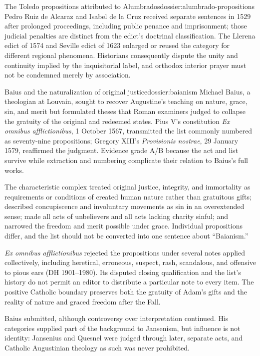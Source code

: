 \begin{heresydossier}{The Toledo propositions attributed to Alumbrados}{dossier:alumbrado-propositions}
\aftermathfield Pedro Ruiz de Alcaraz and Isabel de la Cruz received separate sentences in 1529 after prolonged proceedings, including public penance and imprisonment; those judicial penalties are distinct from the edict's doctrinal classification. The Llerena edict of 1574 and Seville edict of 1623 enlarged or reused the category for different regional phenomena. Historians consequently dispute the unity and continuity implied by the inquisitorial label, and orthodox interior prayer must not be condemned merely by association.
\end{heresydossier}

\begin{heresydossier}{Baius and the naturalization of original justice}{dossier:baianism}
\objectfield Michael Baius, a theologian at Louvain, sought to recover Augustine's teaching on nature, grace, sin, and merit but formulated theses that Roman examiners judged to collapse the gratuity of the original and redeemed states. Pius V's constitution \emph{Ex omnibus afflictionibus}, 1 October 1567, transmitted the list commonly numbered as seventy-nine propositions; Gregory XIII's \emph{Provisionis nostrae}, 29 January 1579, reaffirmed the judgment. Evidence grade A/B because the act and list survive while extraction and numbering complicate their relation to Baius's full works.

\propositionfield The characteristic complex treated original justice, integrity, and immortality as requirements or conditions of created human nature rather than gratuitous gifts; described concupiscence and involuntary movements as sin in an overextended sense; made all acts of unbelievers and all acts lacking charity sinful; and narrowed the freedom and merit possible under grace. Individual propositions differ, and the list should not be converted into one sentence about ``Baianism.''

\responsefield \emph{Ex omnibus afflictionibus} rejected the propositions under several notes applied collectively, including heretical, erroneous, suspect, rash, scandalous, and offensive to pious ears (DH 1901--1980). Its disputed closing qualification and the list's history do not permit an editor to distribute a particular note to every item. The positive Catholic boundary preserves both the gratuity of Adam's gifts and the reality of nature and graced freedom after the Fall.

\aftermathfield Baius submitted, although controversy over interpretation continued. His categories supplied part of the background to Jansenism, but influence is not identity: Jansenius and Quesnel were judged through later, separate acts, and Catholic Augustinian theology as such was never prohibited.
\end{heresydossier}

